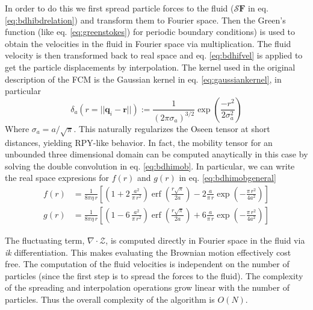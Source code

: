 \documentclass[ twoside,openright,titlepage,numbers=noenddot,%
headinclude,footinclude,cleardoublepage=empty,abstract=on,
BCOR=5mm,paper=a4,fontsize=11pt, dvipsnames
]{scrreprt}
\renewcommand{\vec}[1]{\bm{#1}}
\newcommand{\oper}[1]{\mathcal{#1}}
\DeclareMathOperator{\erf}{erf}
\newcommand{\ppos}{q}
\newcommand{\fpos}{r}
\begin{document}
In order to do this we first spread particle forces to the fluid ($\oper{S}\vec{F}$ in eq. \eqref{eq:bdhibdrelation}) and transform them to Fourier space. Then the Green's function (like eq. \eqref{eq:greenstokes}) for periodic boundary conditions) is used to obtain the velocities in the fluid in Fourier space via multiplication. The fluid velocity is then transformed back to real space and eq. \eqref{eq:bdhifvel} is applied to get the particle displacements by interpolation.
The kernel used in the original description of the \gls{FCM} is the Gaussian kernel in eq. \eqref{eq:gaussiankernel}, in particular
\begin{equation}
  \label{eq:fcmkernel}
  \delta_a(r = ||\vec{\ppos}_i - \vec{\fpos}||) := \frac{1}{(2\pi\sigma_a)^{3/2}}\exp\left(\frac{-r^2}{2\sigma_a^2}\right)
\end{equation}
Where $\sigma_a = a/\sqrt{\pi}$. This naturally regularizes the Oseen tensor at short distances, yielding \gls{RPY}-like behavior. In fact, the mobility tensor for an unbounded three dimensional domain can be computed anaytically in this case by solving the double convolution in eq. \eqref{eq:bdhimob}. In particular, we can write the real space expresions for $f(r)$ and $g(r)$ in eq. \eqref{eq:bdhimobgeneral}
\begin{equation}
  \label{eq:fcmmob}
  \begin{aligned}
f(r) & =  \frac{1}{8\pi\eta\,r}\left[\left(1+2\,\frac{a^{2}}{\pi\,r^{2}}\right){\erf}\left(\frac{r\sqrt{\pi}}{2a}\right)-2\frac{a}{\pi\,r}\exp\left(-\frac{\pi\,r^{2}}{4a^{2}}\right)\right]\\
g(r) & =  \frac{1}{8\pi\eta\,r}\left[\left(1-6\,\frac{a^{2}}{\pi\,r^{2}}\right){\erf}\left(\frac{r\sqrt{\pi}}{2a}\right)+6\frac{a}{\pi\,r}\exp\left(-\frac{\pi\,r^{2}}{4a^{2}}\right)\right]
  \end{aligned}
\end{equation}

The fluctuating term, $\nabla\cdot\mathcal{Z}$, is computed directly in Fourier space in the fluid via \emph{ik} differentiation. This makes evaluating the Brownian motion effectively cost free.
The computation of the fluid velocities is independent on the number of particles (since the first step is to spread the forces to the fluid). The complexity of the spreading and interpolation operations grow linear with the number of particles. Thus the overall complexity of the algorithm is $O(N)$.
\end{document}
